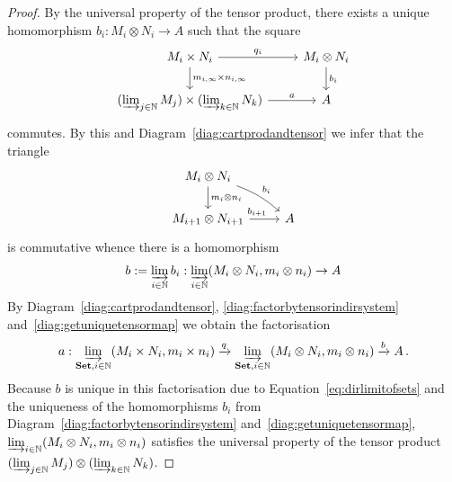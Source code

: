 \documentclass[12pt, a4paper]{article}
\numberwithin{equation}{section}
\theoremstyle{empty}
\theoremstyle{nonumberplain}
\newtheorem{proof}{Proof}
\begin{document}
\begin{proof}
By the universal property of the tensor product, there exists a unique homomorphism $b_i: M_i \otimes N_i \rightarrow A$ such that the square
\begin{equation}\label{diag:factorbytensorindirsystem}
\begin{tikzcd}
    M_i \times N_i \arrow[r, "q_i"] \arrow[d, "m_{i, \infty} \times n_{i, \infty}"] & M_i \otimes N_i \arrow[d, "b_i"] \\
    (\varinjlim_{j \in \mathbb{N}} M_j) \times (\varinjlim_{k \in \mathbb{N}} N_k) \arrow[r, "a"] & A
\end{tikzcd}
\end{equation}
commutes. By this and Diagram~\ref{diag:cartprodandtensor} we infer that the triangle
\begin{equation}\label{diag:getuniquetensormap}
\begin{tikzcd}
    M_i \otimes N_i \arrow[dr, bend left = 10, "b_i"] \arrow[d, "m_i \otimes n_i"] & \\
    M_{i+1} \otimes N_{i+1} \arrow[r, "b_{i+1}" near start] & A
\end{tikzcd}
\end{equation}
is commutative whence there is a homomorphism
\[ b := \varinjlim_{i \in \mathbb{N}} b_i: \varinjlim_{i \in \mathbb{N}} (M_i \otimes N_i, m_i \otimes n_i) \rightarrow A \]
By Diagram~\ref{diag:cartprodandtensor}, \ref{diag:factorbytensorindirsystem} and~\ref{diag:getuniquetensormap} we obtain the factorisation
\[ a: \varinjlim_{\mathbf{Set}, i \in \mathbb{N}} (M_i \times N_i, m_i \times n_i) \xrightarrow{q} \varinjlim_{\mathbf{Set}, i \in \mathbb{N}} (M_i \otimes N_i, m_i \otimes n_i) \xrightarrow{b} A \, . \]
Because $b$ is unique in this factorisation due to Equation~\ref{eq:dirlimitofsets} and the uniqueness of the homomorphisms $b_i$ from Diagram~\ref{diag:factorbytensorindirsystem} and~\ref{diag:getuniquetensormap}, $\varinjlim_{i \in \mathbb{N}} (M_i \otimes N_i, m_i \otimes n_i)$ satisfies the universal property of the tensor product $(\varinjlim_{j \in \mathbb{N}} M_j) \otimes (\varinjlim_{k \in \mathbb{N}} N_k)$.
\end{proof}
\end{document}
